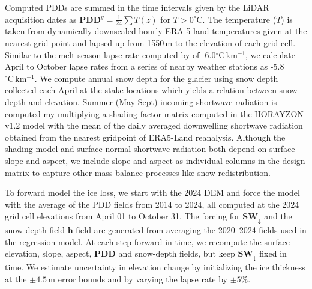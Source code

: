 \documentclass[annals,review,oneside]{igs}
\begin{document}
Computed PDDs are summed in the time intervals given by the LiDAR acquisition dates as $\mathbf{PDD}^y = \frac{1}{24}\sum T(z)$ for $T>0^{\circ}$C. The temperature ($T$) is taken from dynamically downscaled hourly ERA-5 land temperatures \citep{Hersbach2020} given at the nearest grid point and lapsed up from 1550\,m to the elevation of each grid cell. Similar to the melt-season lapse rate computed by \cite{Shea2009} of -6.0$\mathrm{^{\circ}C\,km^{-1}}$, we calculate April to October lapse rates from a series of nearby weather stations as -5.8$\mathrm{^{\circ}C\,km^{-1}}$. We compute annual  snow depth for the glacier using snow depth collected each April at the stake locations which yields a relation between snow depth and elevation. Summer (May-Sept) incoming shortwave radiation is computed my multiplying a shading factor matrix computed in the HORAYZON v1.2 model \citep{Steger2022} with the mean of the daily averaged downwelling shortwave radiation obtained from the nearest gridpoint of ERA5-Land reanalysis. Although the shading model and surface normal shortwave radiation both depend on surface slope and aspect, we include slope and aspect as individual columns in the design matrix to capture other mass balance processes like snow redistribution.

To forward model the ice loss, we start with the 2024 DEM and force the model with the average of the PDD fields from 2014 to 2024, all computed at the 2024 grid cell elevations from April 01 to October 31. The forcing for $\mathbf{SW_{\downarrow}}$ and the snow depth field $\mathbf{h}$ field are generated from averaging the 2020--2024 fields used in the regression model. At each step forward in time, we recompute the surface elevation, slope, aspect, $\mathbf{PDD}$ and snow-depth fields, but keep $\mathbf{SW_{\downarrow}}$ fixed in time. We estimate uncertainty in elevation change by initializing the ice thickness at the $\pm 4.5$\,m error bounds and by varying the lapse rate by $\pm 5\%$. 
\end{document}
